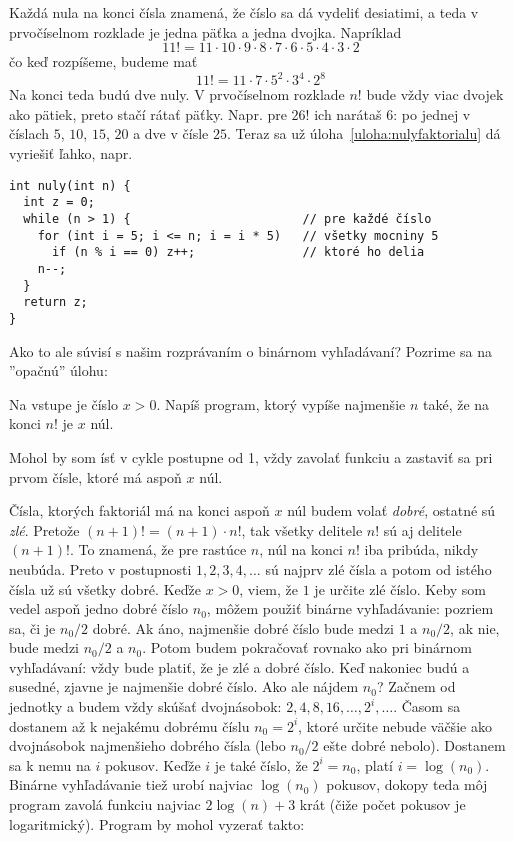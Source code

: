 Každá nula na konci čísla znamená, že číslo sa dá vydeliť desiatimi, a teda v prvočíselnom
rozklade je jedna päťka a jedna dvojka. Napríklad 
$$11! = 11\cdot10\cdot9\cdot8\cdot7\cdot6\cdot5\cdot4\cdot3\cdot2$$
čo keď rozpíšeme, budeme mať
$$11! = 11\cdot7\cdot5^2\cdot3^4\cdot2^8$$
Na konci teda budú dve nuly. V prvočíselnom rozklade $n!$ bude vždy viac dvojek ako pätiek,
preto stačí rátať päťky. Napr. pre $26!$ ich narátaš $6$: po jednej v číslach $5$, $10$, $15$,
$20$ a dve v čísle $25$. Teraz sa už úloha~\ref{uloha:nulyfaktorialu} dá vyriešiť ľahko, napr.


\begin{lstlisting}[] 
int nuly(int n) {
  int z = 0;
  while (n > 1) {                        // pre každé číslo
    for (int i = 5; i <= n; i = i * 5)   // všetky mocniny 5
      if (n % i == 0) z++;               // ktoré ho delia
    n--;
  }
  return z;
}
\end{lstlisting}


Ako to ale súvisí s našim rozprávaním o binárnom vyhľadávaní? Pozrime sa na ''opačnú''
úlohu:

\begin{uloha}
  Na vstupe je číslo $x>0$. Napíš program, ktorý vypíše najmenšie $n$ také, že na konci
  $n!$ je $x$ núl.
\end{uloha}

Mohol by som ísť v cykle postupne od 1, vždy zavolať funkciu  a zastaviť sa
pri prvom čísle, ktoré má aspoň $x$ núl. 

 
Čísla, ktorých faktoriál
má na konci aspoň $x$ núl budem volať {\em dobré}, ostatné sú {\em zlé}.
Pretože \hbox{$(n+1)!=(n+1)\cdot n!$,} tak všetky delitele $n!$ sú aj delitele $(n+1)!$. To znamená,
že pre rastúce $n$, núl na konci $n!$ iba pribúda, nikdy neubúda. Preto v postupnosti
$1,2,3,4,\ldots$ sú najprv zlé čísla a potom od istého čísla už sú všetky dobré.
Keďže $x>0$, viem, že $1$ je určite zlé číslo.
Keby som vedel aspoň jedno dobré číslo $n_0$, môžem použiť binárne vyhľadávanie:
pozriem sa, či je $n_0/2$ dobré. Ak áno, najmenšie dobré číslo bude medzi $1$ a $n_0/2$,
ak nie, bude medzi $n_0/2$ a $n_0$. Potom budem pokračovať rovnako ako pri binárnom
vyhľadávaní: vždy bude platiť, že  je zlé a  dobré číslo. Keď nakoniec
budú  a  susedné, zjavne  je najmenšie dobré číslo.
Ako ale nájdem $n_0$? Začnem od jednotky a budem vždy skúšať dvojnásobok:
$2,4,8,16,\ldots,2^i,\ldots$. Časom sa dostanem až k nejakému dobrému číslu $n_0=2^i$, 
ktoré určite
nebude väčšie ako dvojnásobok najmenšieho dobrého čísla (lebo $n_0/2$ ešte dobré nebolo).
Dostanem sa k nemu na $i$ pokusov. Keďže $i$ je také číslo, že $2^i=n_0$, platí
$i=\log(n_0)$. Binárne vyhľadávanie tiež urobí najviac $\log(n_0)$ pokusov, dokopy
teda môj program zavolá funkciu  najviac $2\log(n)+3$ krát (čiže počet
pokusov je logaritmický). 
Program by mohol vyzerať takto:


